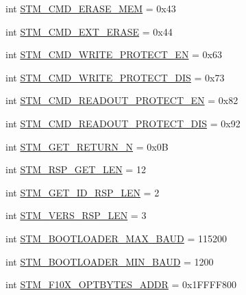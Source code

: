 \begin{DoxyCompactItemize}
\item 
int \hyperlink{namespacestm__tools_1_1serialflasher_1_1constants_a9871a69524ee4c9871df968d4f1b6a37}{S\+T\+M\+\_\+\+C\+M\+D\+\_\+\+E\+R\+A\+S\+E\+\_\+\+M\+EM} = 0x43
\item 
int \hyperlink{namespacestm__tools_1_1serialflasher_1_1constants_ab3c1fb827d58301ab66a7d659220b6bd}{S\+T\+M\+\_\+\+C\+M\+D\+\_\+\+E\+X\+T\+\_\+\+E\+R\+A\+SE} = 0x44
\item 
int \hyperlink{namespacestm__tools_1_1serialflasher_1_1constants_a5d774c1771596f29cd18be93f349c5d3}{S\+T\+M\+\_\+\+C\+M\+D\+\_\+\+W\+R\+I\+T\+E\+\_\+\+P\+R\+O\+T\+E\+C\+T\+\_\+\+EN} = 0x63
\item 
int \hyperlink{namespacestm__tools_1_1serialflasher_1_1constants_acbb182b85efbf5850fe0435979ce7fd1}{S\+T\+M\+\_\+\+C\+M\+D\+\_\+\+W\+R\+I\+T\+E\+\_\+\+P\+R\+O\+T\+E\+C\+T\+\_\+\+D\+IS} = 0x73
\item 
int \hyperlink{namespacestm__tools_1_1serialflasher_1_1constants_a1b8e486151dc5e6f1e549b665d0682b6}{S\+T\+M\+\_\+\+C\+M\+D\+\_\+\+R\+E\+A\+D\+O\+U\+T\+\_\+\+P\+R\+O\+T\+E\+C\+T\+\_\+\+EN} = 0x82
\item 
int \hyperlink{namespacestm__tools_1_1serialflasher_1_1constants_a35e00bb803e9eaf44452c62752779e6f}{S\+T\+M\+\_\+\+C\+M\+D\+\_\+\+R\+E\+A\+D\+O\+U\+T\+\_\+\+P\+R\+O\+T\+E\+C\+T\+\_\+\+D\+IS} = 0x92
\item 
int \hyperlink{namespacestm__tools_1_1serialflasher_1_1constants_a7dd44899886a9e3035bb3b6746dd8203}{S\+T\+M\+\_\+\+G\+E\+T\+\_\+\+R\+E\+T\+U\+R\+N\+\_\+N} = 0x0B
\item 
int \hyperlink{namespacestm__tools_1_1serialflasher_1_1constants_a2115b42a2c641cb0bd3e49482c836530}{S\+T\+M\+\_\+\+R\+S\+P\+\_\+\+G\+E\+T\+\_\+\+L\+EN} = 12
\item 
int \hyperlink{namespacestm__tools_1_1serialflasher_1_1constants_a21ae2319bf1d542808d538fb56734263}{S\+T\+M\+\_\+\+G\+E\+T\+\_\+\+I\+D\+\_\+\+R\+S\+P\+\_\+\+L\+EN} = 2
\item 
int \hyperlink{namespacestm__tools_1_1serialflasher_1_1constants_ada4f39c4ccd1fbe20a1783d6b78024fe}{S\+T\+M\+\_\+\+V\+E\+R\+S\+\_\+\+R\+S\+P\+\_\+\+L\+EN} = 3
\item 
int \hyperlink{namespacestm__tools_1_1serialflasher_1_1constants_a2c47a48fe05305572ad6faa596f77346}{S\+T\+M\+\_\+\+B\+O\+O\+T\+L\+O\+A\+D\+E\+R\+\_\+\+M\+A\+X\+\_\+\+B\+A\+UD} = 115200
\item 
int \hyperlink{namespacestm__tools_1_1serialflasher_1_1constants_aaf62af7e54b0d4889b5df4707424ce3a}{S\+T\+M\+\_\+\+B\+O\+O\+T\+L\+O\+A\+D\+E\+R\+\_\+\+M\+I\+N\+\_\+\+B\+A\+UD} = 1200
\item 
int \hyperlink{namespacestm__tools_1_1serialflasher_1_1constants_a070aadb2eb435572cd9974a67a78b32c}{S\+T\+M\+\_\+\+F10\+X\+\_\+\+O\+P\+T\+B\+Y\+T\+E\+S\+\_\+\+A\+D\+DR} = 0x1\+F\+F\+F\+F800
\end{DoxyCompactItemize}


